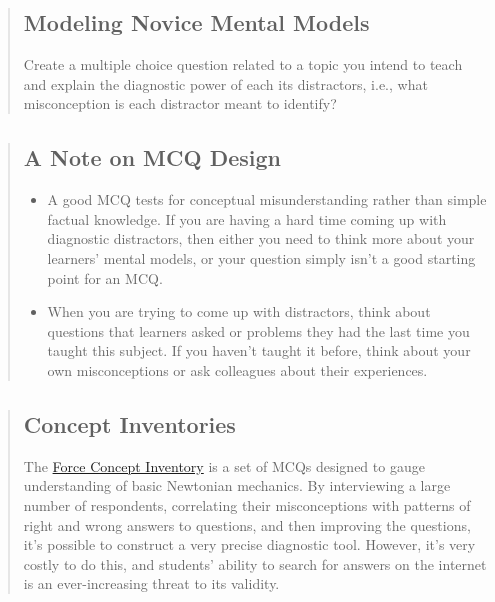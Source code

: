 \begin{quotation}   %
\subsection*{Modeling Novice Mental Models}

Create a multiple choice question related to a topic you intend to teach
and explain the diagnostic power of each its distractors,
i.e., what misconception is each distractor meant to identify?
\end{quotation}   %

\begin{quotation}   %
\subsection*{A Note on MCQ Design}

\begin{itemize}
\item A good MCQ tests for conceptual misunderstanding rather than simple factual knowledge.
If you are having a hard time coming up with diagnostic distractors,
then either you need to think more about your learners' mental models,
or your question simply isn't a good starting point for an MCQ.
\item When you are trying to come up with distractors,
think about questions that learners asked or problems they had
the last time you taught this subject.
If you haven't taught it before,
think about your own misconceptions
or ask colleagues about their experiences.
\end{itemize}
\end{quotation}   %

\begin{quotation}   %
\subsection*{Concept Inventories}

The \href{https://en.wikipedia.org/wiki/Force\_Concept\_Inventory}{Force Concept Inventory}
is a set of MCQs designed to gauge understanding of basic Newtonian mechanics.
By interviewing a large number of respondents,
correlating their misconceptions with patterns of right and wrong answers to questions,
and then improving the questions,
it's possible to construct a very precise diagnostic tool.
However,
it's very costly to do this,
and students' ability to search for answers on the internet
is an ever-increasing threat to its validity.
\end{quotation}   %

